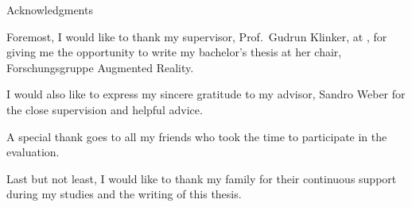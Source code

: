 \clearpage
{}
\thispagestyle{empty}

\vspace*{20mm}

\begin{center}
{ Acknowledgments}
\end{center}

\vspace{10mm}

Foremost, I would like to thank my supervisor, Prof.\ Gudrun Klinker, at \getUniversity{}, for giving me the opportunity to write my bachelor's thesis at her chair, Forschungsgruppe Augmented Reality.

I would also like to express my sincere gratitude to my advisor, Sandro Weber for the close supervision and helpful advice.

A special thank goes to all my friends who took the time to participate in the evaluation.

Last but not least, I would like to thank my family for their continuous support during my studies and the writing of this thesis.

\cleardoublepage{}

